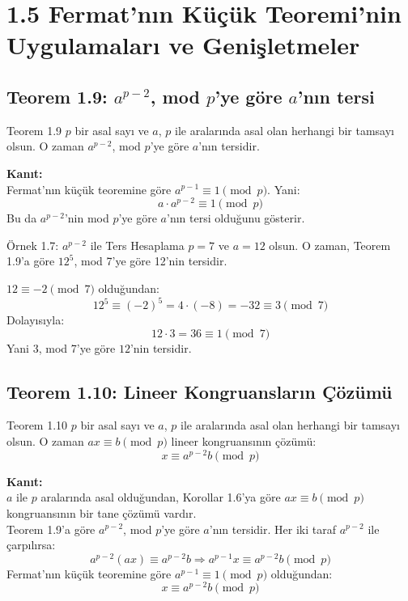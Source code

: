 \documentclass[12pt]{article}
\begin{document}
\section*{1.5 Fermat'nın Küçük Teoremi'nin Uygulamaları ve Genişletmeler}

\subsection*{Teorem 1.9: $a^{p-2}$, mod $p$'ye göre $a$'nın tersi}

\begin{theorembox}{Teorem 1.9}
$p$ bir asal sayı ve $a$, $p$ ile aralarında asal olan herhangi bir tamsayı olsun. O zaman $a^{p-2}$, mod $p$'ye göre $a$'nın tersidir.

\textbf{Kanıt:}\\
Fermat'nın küçük teoremine göre $a^{p-1} \equiv 1 \pmod{p}$. Yani:
\[
a \cdot a^{p-2} \equiv 1 \pmod{p}
\]
Bu da $a^{p-2}$'nin mod $p$'ye göre $a$'nın tersi olduğunu gösterir.
\end{theorembox}

\begin{examplebox}{Örnek 1.7: $a^{p-2}$ ile Ters Hesaplama}
$p = 7$ ve $a = 12$ olsun. O zaman, Teorem 1.9'a göre $12^5$, mod 7'ye göre 12'nin tersidir.

$12 \equiv -2 \pmod{7}$ olduğundan:
\[
12^5 \equiv (-2)^5 = 4 \cdot (-8) = -32 \equiv 3 \pmod{7}
\]
Dolayısıyla:
\[
12 \cdot 3 = 36 \equiv 1 \pmod{7}
\]
Yani $3$, mod 7'ye göre $12$'nin tersidir.
\end{examplebox}

\subsection*{Teorem 1.10: Lineer Kongruansların Çözümü}

\begin{theorembox}{Teorem 1.10}
$p$ bir asal sayı ve $a$, $p$ ile aralarında asal olan herhangi bir tamsayı olsun. O zaman $ax \equiv b \pmod{p}$ lineer kongruansının çözümü:
\[
x \equiv a^{p-2}b \pmod{p}
\]

\textbf{Kanıt:}\\
$a$ ile $p$ aralarında asal olduğundan, Korollar 1.6'ya göre $ax \equiv b \pmod{p}$ kongruansının bir tane çözümü vardır.\\
Teorem 1.9'a göre $a^{p-2}$, mod $p$'ye göre $a$'nın tersidir. Her iki taraf $a^{p-2}$ ile çarpılırsa:
\[
a^{p-2}(ax) \equiv a^{p-2}b \Rightarrow a^{p-1}x \equiv a^{p-2}b \pmod{p}
\]
Fermat'nın küçük teoremine göre $a^{p-1} \equiv 1 \pmod{p}$ olduğundan:
\[
x \equiv a^{p-2}b \pmod{p}
\]
\end{theorembox}
\end{document}
